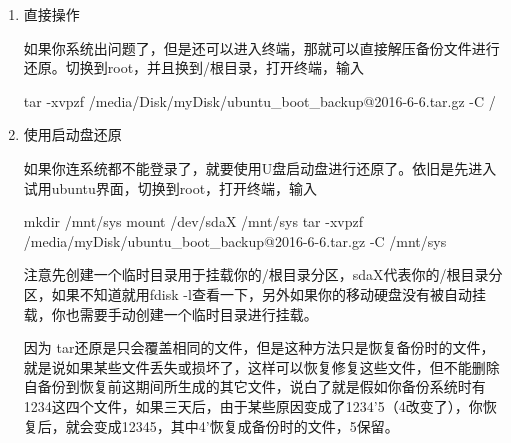 \begin{enumerate}
    \item 直接操作
    
    如果你系统出问题了，但是还可以进入终端，那就可以直接解压备份文件进行还原。切换到root，并且换到/根目录，打开终端，输入
    
    \begin{tcode}
        tar -xvpzf /media/Disk/myDisk/ubuntu_boot_backup@2016-6-6.tar.gz -C /
    \end{tcode}

    \item 使用启动盘还原
    
    如果你连系统都不能登录了，就要使用U盘启动盘进行还原了。依旧是先进入试用ubuntu界面，切换到root，打开终端，输入

    \begin{tcode}
        mkdir /mnt/sys
        mount /dev/sdaX /mnt/sys
        tar -xvpzf /media/myDisk/ubuntu_boot_backup@2016-6-6.tar.gz -C /mnt/sys
    \end{tcode}

    注意先创建一个临时目录用于挂载你的/根目录分区，sdaX代表你的/根目录分区，如果不知道就用fdisk -l查看一下，另外如果你的移动硬盘没有被自动挂载，你也需要手动创建一个临时目录进行挂载。

    因为 tar还原是只会覆盖相同的文件，但是这种方法只是恢复备份时的文件，就是说如果某些文件丢失或损坏了，这样可以恢复修复这些文件，但不能删除自备份到恢复前这期间所生成的其它文件，说白了就是假如你备份系统时有1234这四个文件，如果三天后，由于某些原因变成了1234’5（4改变了），你恢复后，就会变成12345，其中4’恢复成备份时的文件，5保留。
\end{enumerate}

